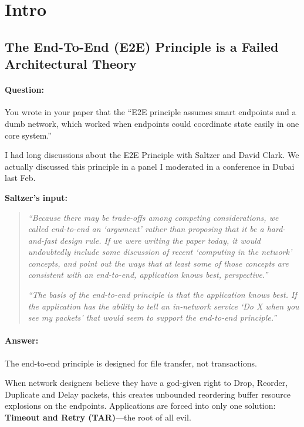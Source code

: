 \documentclass[../../../OAE-SPEC-MAIN.tex]{subfiles}
\begin{document}
\section{Intro}


\subsection{The End-To-End (E2E) Principle is a Failed Architectural Theory}

\paragraph{Question:} You wrote in your paper that the ``E2E principle assumes smart endpoints and a dumb network, which worked when endpoints could coordinate state easily in one core system.''

I had long discussions about the E2E Principle with Saltzer and David Clark. We actually discussed this principle in a panel I moderated in a conference in Dubai last Feb.

\textbf{Saltzer's input:}
\begin{quote}
\textit{``Because there may be trade-offs among competing considerations, we called end-to-end an `argument' rather than proposing that it be a hard-and-fast design rule. If we were writing the paper today, it would undoubtedly include some discussion of recent `computing in the network' concepts, and point out the ways that at least some of those concepts are consistent with an end-to-end, application knows best, perspective.''}

\textit{``The basis of the end-to-end principle is that the application knows best. If the application has the ability to tell an in-network service `Do X when you see my packets' that would seem to support the end-to-end principle.''}
\end{quote}

\paragraph{Answer:} The end-to-end principle is designed for file transfer, not transactions.

When network designers believe they have a god-given right to Drop, Reorder, Duplicate and Delay packets, this creates unbounded reordering buffer resource explosions on the endpoints. Applications are forced into only one solution: \textbf{Timeout and Retry (TAR)}---the root of all evil.
\end{document}
